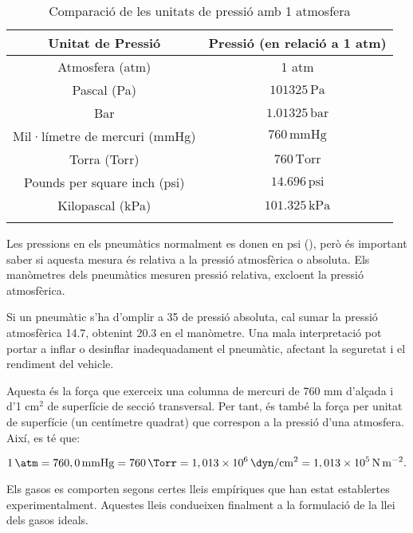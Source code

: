 \begin{longtable}{cc}
    \hline
    \textbf{Unitat de Pressió} & \textbf{Pressió (en relació a 1 atm)} \\ \midrule\endhead
    Atmosfera (atm) & 1 atm \\ 
    Pascal (Pa) & \( 101325 \, \text{Pa} \) \\ 
    Bar & \( 1.01325 \, \text{bar} \) \\ 
    Mil·límetre de mercuri (mmHg) & \( 760 \, \text{mmHg} \) \\ 
    Torra (Torr) & \( 760 \, \text{Torr} \) \\ 
    Pounds per square inch (psi) & \( 14.696 \, \text{psi} \) \\ 
    Kilopascal (kPa) & \( 101.325 \, \text{kPa} \) \\    \bottomrule
    \caption{Comparació de les unitats de pressió amb 1 atmosfera}
    \end{longtable}

    \begin{mybox}[title=La pressió dels pneumàtics]
        Les pressions en els pneumàtics normalment es donen en psi (\si{\psi}), però és important saber si aquesta mesura és relativa a la pressió atmosfèrica o absoluta. Els manòmetres dels pneumàtics mesuren pressió relativa, excloent la pressió atmosfèrica.
    
        Si un pneumàtic s'ha d'omplir a \qty{35}{\psi} de pressió absoluta, cal sumar la pressió atmosfèrica \qty{14.7}{\psi}, obtenint \qty{20.3}{\psi} en el manòmetre. Una mala interpretació pot portar a inflar o desinflar inadequadament el pneumàtic, afectant la seguretat i el rendiment del vehicle.
        \end{mybox} 

Aquesta és la força que exerceix una columna de mercuri de 760 mm d'alçada i d'1 $\text{cm}^2$ de superfície de secció transversal. Per tant, és també la força per unitat de superfície (un centímetre quadrat) que correspon a la pressió d'una atmosfera.   
 Així, es té que:

\[
1 \, \si{\atm} = 760,0 \, \si\mmHg= 760 \,\si\Torr
= 1,013 \times 10^6 \, \si{\dyn\per\square\cm} = 1,013 \times 10^5 \, \si{\newton\per\square\meter}.
\]

Els gasos es comporten segons certes lleis empíriques que han estat establertes experimentalment. Aquestes lleis condueixen finalment a la formulació de la llei dels gasos ideals.

